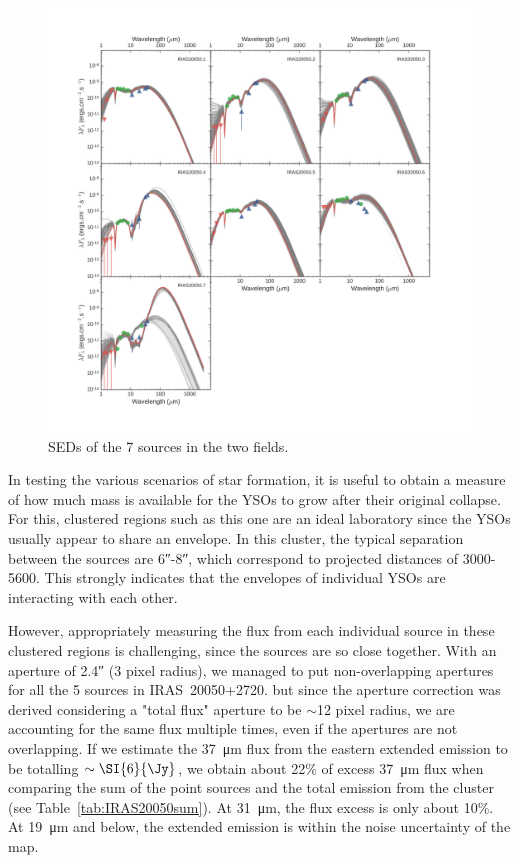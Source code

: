 \begin{figure}
\begin{center}
\hspace*{-1in}
\includegraphics[width=1.4\textwidth]{Figures/IRAS20050_SEDs.png}
\vspace{-1.5cm}
\caption[IRAS20050+2720 SEDs]{SEDs of the 7 sources in the two fields. }
\label{fig:IRAS20050_SEDs}
\end{center}
\end{figure}


In testing the various scenarios of star formation, it is useful to obtain a measure of how much mass is available for the YSOs to grow after their original collapse. For this, clustered regions such as this one are an ideal laboratory since the YSOs usually appear to share an envelope. In this cluster, the typical separation between the sources are \ang{;;6}-\ang{;;8}, which correspond to projected distances of \num{3000}-\SI{5600}{\au}. This strongly indicates that the envelopes of individual YSOs are interacting with each other.


However, appropriately measuring the flux from each individual source in these clustered regions is challenging, since the sources are so close together. With an aperture of \ang{;;2.4} (3 pixel radius), we managed to put non-overlapping apertures for all the 5 sources in IRAS~20050+2720. but since the aperture correction was derived considering a "total flux" aperture to be $\sim$12 pixel radius, we are accounting for the same flux multiple times, even if the apertures are not overlapping. If we estimate the \SI{37}{\um} flux from the eastern extended emission to be totalling $\sim\SI{6}{\Jy}$, we obtain about 22\% of excess \SI{37}{\um} flux when comparing the sum of the point sources and the total emission from the cluster (see Table~\ref{tab:IRAS20050sum}). At \SI{31}{\um}, the flux excess is only about 10\%. At \SI{19}{\um} and below, the extended emission is within the noise uncertainty of the map. 

